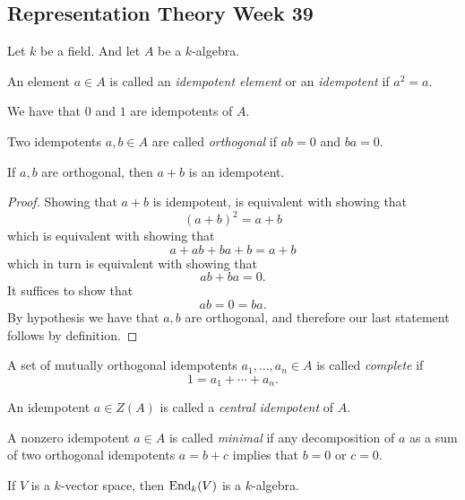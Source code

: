 \subsection{Representation Theory Week 39}

Let \(k\) be a field. And let \(A\) be a \(k\)-algebra.

\begin{defn}
An element \(a\in A\) is called an \emph{idempotent element} or an \emph{idempotent} if \(a^2=a.\)
\end{defn}

\begin{prop}
We have that \(0\) and \(1\) are idempotents of \(A\).
\end{prop}

\begin{defn}
Two idempotents \(a,b\in A\) are called \emph{orthogonal} if \(ab=0\) and \(ba=0\).
\end{defn}

\begin{prop}
If \(a,b\) are orthogonal, then \(a+b\) is an idempotent.
\end{prop}

\begin{proof}
Showing that \(a+b\) is idempotent, is equivalent with showing that
\[
(a+b)^2=a+b
\]
which is equivalent with showing that
\[
a+ab+ba+b=a+b
\]
which in turn is equivalent with showing that
\[
ab+ba=0.
\]
It suffices to show that
\[
ab=0=ba.
\]
By hypothesis we have that $a,b$ are orthogonal, and therefore our last statement follows by definition.
\end{proof}

\begin{defn}
A set of mutually orthogonal idempotents \(a_{1},\ldots ,a_{n}\in A\) is called \emph{complete} if
\[
1=a_{1}+\cdots +a_{n}.
\]
\end{defn}

\begin{defn}
An idempotent \(a\in Z(A)\) is called a \emph{central idempotent} of \(A\).
\end{defn}

\begin{defn}
A nonzero idempotent \(a\in A\) is called \emph{minimal} if any decomposition of \(a\) as a sum of two orthogonal idempotents \(a=b+c\) implies that \(b=0\) or \(c=0\).
\end{defn}

\begin{prop}
If \(V\) is a \(k\)-vector space, then \(\operatorname{End}_{k}(V)\) is a \(k\)-algebra.
\end{prop}


